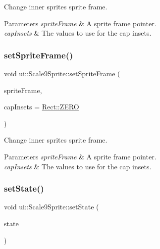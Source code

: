 Change inner sprite\textquotesingle{}s sprite frame. 


\begin{DoxyParams}{Parameters}
{\em sprite\+Frame} & A sprite frame pointer. \\
\hline
{\em cap\+Insets} & The values to use for the cap insets. \\
\hline
\end{DoxyParams}
\mbox{\label{classui_1_1Scale9Sprite_a296c3b8369428727173c2e8b3dcad00a}} 
\subsubsection{\texorpdfstring{set\+Sprite\+Frame()}{setSpriteFrame()}\hspace{0.1cm}{\footnotesize\ttfamily [2/2]}}
{\footnotesize\ttfamily void ui\+::\+Scale9\+Sprite\+::set\+Sprite\+Frame (\begin{DoxyParamCaption}\item[{\hyperlink{classSpriteFrame}{Sprite\+Frame} $\ast$}]{sprite\+Frame,  }\item[{const \hyperlink{classRect}{Rect} \&}]{cap\+Insets = {\ttfamily \hyperlink{classRect_a590be46e60027b2ca0f62a457f91a83e}{Rect\+::\+Z\+E\+RO}} }\end{DoxyParamCaption})\hspace{0.3cm}{\ttfamily [virtual]}}



Change inner sprite\textquotesingle{}s sprite frame. 


\begin{DoxyParams}{Parameters}
{\em sprite\+Frame} & A sprite frame pointer. \\
\hline
{\em cap\+Insets} & The values to use for the cap insets. \\
\hline
\end{DoxyParams}
\mbox{\label{classui_1_1Scale9Sprite_a511b07afa3ccc53fbd2e33f0dca78e8c}} 
\subsubsection{\texorpdfstring{set\+State()}{setState()}\hspace{0.1cm}{\footnotesize\ttfamily [1/2]}}
{\footnotesize\ttfamily void ui\+::\+Scale9\+Sprite\+::set\+State (\begin{DoxyParamCaption}\item[{\hyperlink{classui_1_1Scale9Sprite_a6580c2817c63b7a2461c48378b199d79}{State}}]{state }\end{DoxyParamCaption})}

